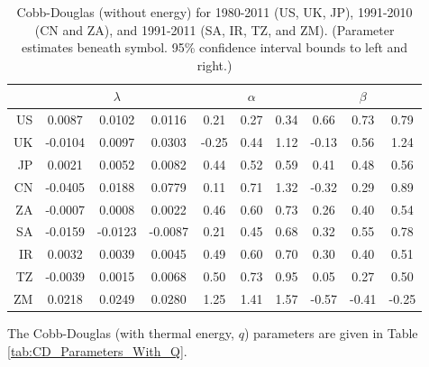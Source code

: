 \documentclass[preprint,authoryear,12pt]{elsarticle}\usepackage{graphicx, color}
\begin{document}
\begin{table}[H]
\begin{center}
\caption{Cobb-Douglas (without energy) for 1980-2011 (US, UK, JP), 1991-2010 (CN and ZA), and 1991-2011 (SA, IR, TZ, and ZM). (Parameter estimates beneath symbol. 95\% confidence interval bounds to left and right.)}
\label{tab:CD_Parameters_No_Energy}
{\tiny
\begin{tabular}{r|ccc|ccc|ccc}
  \hline
 &   & $\lambda$ &   &   & $\alpha$ &   &   & $\beta$ &   \\ 
  \hline
US & 0.0087 & 0.0102 & 0.0116 & 0.21 & 0.27 & 0.34 & 0.66 & 0.73 & 0.79 \\ 
  UK & -0.0104 & 0.0097 & 0.0303 & -0.25 & 0.44 & 1.12 & -0.13 & 0.56 & 1.24 \\ 
  JP & 0.0021 & 0.0052 & 0.0082 & 0.44 & 0.52 & 0.59 & 0.41 & 0.48 & 0.56 \\ 
  CN & -0.0405 & 0.0188 & 0.0779 & 0.11 & 0.71 & 1.32 & -0.32 & 0.29 & 0.89 \\ 
  ZA & -0.0007 & 0.0008 & 0.0022 & 0.46 & 0.60 & 0.73 & 0.26 & 0.40 & 0.54 \\ 
  SA & -0.0159 & -0.0123 & -0.0087 & 0.21 & 0.45 & 0.68 & 0.32 & 0.55 & 0.78 \\ 
  IR & 0.0032 & 0.0039 & 0.0045 & 0.49 & 0.60 & 0.70 & 0.30 & 0.40 & 0.51 \\ 
  TZ & -0.0039 & 0.0015 & 0.0068 & 0.50 & 0.73 & 0.95 & 0.05 & 0.27 & 0.50 \\ 
  ZM & 0.0218 & 0.0249 & 0.0280 & 1.25 & 1.41 & 1.57 & -0.57 & -0.41 & -0.25 \\ 
   \hline
\end{tabular}
}
\end{center}
\end{table}



The Cobb-Douglas (with thermal energy, $q$) parameters are given in Table \ref{tab:CD_Parameters_With_Q}.
\end{document}
